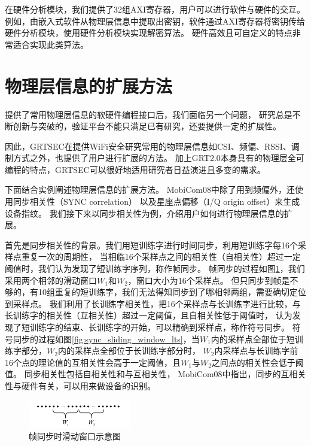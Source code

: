 	在硬件分析模块，我们提供了32组AXI寄存器，用户可以进行软件与硬件的交互。
	例如，由嵌入式软件从物理层信息中提取出密钥，软件通过AXI寄存器将密钥传给硬件分析模块，使用硬件分析模块实现解密算法。
	硬件高效且可自定义的特点非常适合实现此类算法。

	\section{物理层信息的扩展方法}\label{sec:grtsec_phyinfo_extension}
	提供了常用物理层信息的软硬件编程接口后，我们面临另一个问题，
	研究总是不断创新与突破的，验证平台不能只满足已有研究，还要提供一定的扩展性。

	因此，GRTSEC在提供WiFi安全研究常用的物理层信息如CSI、频偏、RSSI、调制方式之外，也提供了用户进行扩展的方法。
	加上GRT2.0本身具有的物理层全可编程的特点，GRTSEC可以很好地适用研究者日益演进且多变的需求。

	下面结合实例阐述物理层信息的扩展方法。
	MobiCom08\cite{mobicom08radiometric}中除了用到频偏外，还使用同步相关性（SYNC correlation）
	以及星座点偏移（I/Q origin offset）来生成设备指纹。
	我们接下来以同步相关性为例，介绍用户如何进行物理层信息的扩展。

	首先是同步相关性的背景。我们用短训练字进行时间同步，利用短训练字每16个采样点重复一次的周期性，
	当相临16个采样点之间的相关性（自相关性）超过一定阈值时，我们认为发现了短训练字序列，称作帧同步。
	帧同步的过程如图\ref{fig:sync_sliding_window}，我们采用两个相邻的滑动窗口$W_1$和$W_2$，窗口大小为16个采样点。
	但只同步到帧是不够的，有10组重复的短训练字，我们无法得知同步到了哪相邻两组，需要确切定位到采样点。
	我们利用了长训练字相关性，把16个采样点与长训练字进行比较，与长训练字的相关性（互相关性）超过一定阈值，且自相关性低于阈值时，
	认为发现了短训练字的结束、长训练字的开始，可以精确到采样点，称作符号同步。
	符号同步的过程如图\ref{fig:sync_sliding_window_lts}，当$W_1$内的采样点全部位于短训练字部分，$W_2$内的采样点全部位于长训练字部分时，
	$W_2$内采样点与长训练字前16个点的理论值的互相关性会高于一定阈值，且$W_1$与$W_2$之间点的相关性会低于阈值。
	同步相关性包括自相关性和与互相关性，
	MobiCom08\cite{mobicom08radiometric}中指出，同步的互相关性与硬件有关，可以用来做设备的识别。

		\begin{figure}
			\centering
			\includegraphics[width=0.4\textwidth]{img/sync_sliding_window.png}
			\caption{帧同步时滑动窗口示意图}
			\label{fig:sync_sliding_window}
		\end{figure}

